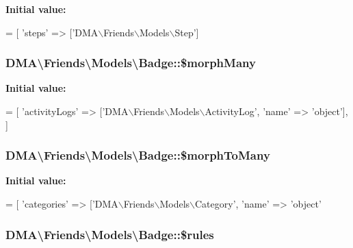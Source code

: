 {\bfseries Initial value\+:}
\begin{DoxyCode}
= [
        \textcolor{stringliteral}{'steps'} => [\textcolor{stringliteral}{'DMA\(\backslash\)Friends\(\backslash\)Models\(\backslash\)Step'}]
\end{DoxyCode}
\hypertarget{classDMA_1_1Friends_1_1Models_1_1Badge_a239fed984baad287f15badaaece428ff}{
\subsubsection[{\$morph\+Many}]{\setlength{\rightskip}{0pt plus 5cm}D\+M\+A\textbackslash{}\+Friends\textbackslash{}\+Models\textbackslash{}\+Badge\+::\$morph\+Many}}\label{classDMA_1_1Friends_1_1Models_1_1Badge_a239fed984baad287f15badaaece428ff}
{\bfseries Initial value\+:}
\begin{DoxyCode}
= [
        \textcolor{stringliteral}{'activityLogs'}  => [\textcolor{stringliteral}{'DMA\(\backslash\)Friends\(\backslash\)Models\(\backslash\)ActivityLog'}, \textcolor{stringliteral}{'name'} => \textcolor{stringliteral}{'object'}],
    ]
\end{DoxyCode}
\hypertarget{classDMA_1_1Friends_1_1Models_1_1Badge_a2efb4ca933422dfb4ca416676d73cad0}{
\subsubsection[{\$morph\+To\+Many}]{\setlength{\rightskip}{0pt plus 5cm}D\+M\+A\textbackslash{}\+Friends\textbackslash{}\+Models\textbackslash{}\+Badge\+::\$morph\+To\+Many}}\label{classDMA_1_1Friends_1_1Models_1_1Badge_a2efb4ca933422dfb4ca416676d73cad0}
{\bfseries Initial value\+:}
\begin{DoxyCode}
= [
        \textcolor{stringliteral}{'categories'}    => [\textcolor{stringliteral}{'DMA\(\backslash\)Friends\(\backslash\)Models\(\backslash\)Category'}, \textcolor{stringliteral}{'name'} => \textcolor{stringliteral}{'object'}
\end{DoxyCode}
\hypertarget{classDMA_1_1Friends_1_1Models_1_1Badge_ab750ee2c75af273ca930a12b1a20b3ae}{
\subsubsection[{\$rules}]{\setlength{\rightskip}{0pt plus 5cm}D\+M\+A\textbackslash{}\+Friends\textbackslash{}\+Models\textbackslash{}\+Badge\+::\$rules}}\label{classDMA_1_1Friends_1_1Models_1_1Badge_ab750ee2c75af273ca930a12b1a20b3ae}
